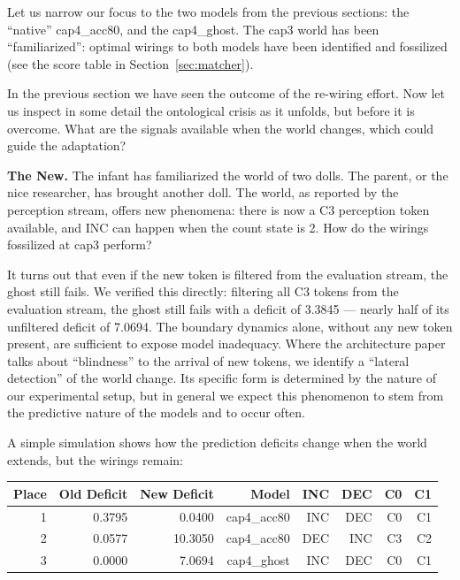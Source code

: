 \documentclass[12pt, a4paper]{article}
\begin{document}
Let us narrow our focus to the two models from the previous sections: the
``native'' cap4\_acc80, and the cap4\_ghost. The cap3 world has been
``familiarized'': optimal wirings to both models have been identified and
fossilized (see the score table in Section~\ref{sec:matcher}).

In the previous section we have seen the outcome of the re-wiring effort. Now
let us inspect in some detail the ontological crisis as it unfolds, but before
it is overcome. What are the signals available when the world changes, which
could guide the adaptation?

\textbf{The New.} The infant has familiarized the world of two dolls. The
parent, or the nice researcher, has brought another doll. The world, as
reported by the perception stream, offers new phenomena: there is now a C3
perception token available, and INC can happen when the count state is 2. How
do the wirings fossilized at cap3 perform?

It turns out that even if the new token is filtered from the evaluation stream,
the ghost still fails. We verified this directly: filtering all C3 tokens from
the evaluation stream, the ghost still fails with a deficit of 3.3845 --- nearly
half of its unfiltered deficit of 7.0694. The boundary dynamics alone, without
any new token present, are sufficient to expose model inadequacy. Where the
architecture paper talks about ``blindness'' to the arrival of new tokens, we
identify a ``lateral detection'' of the world change. Its specific form is
determined by the nature of our experimental setup, but in general we expect
this phenomenon to stem from the predictive nature of the models and to occur
often.

A simple simulation shows how the prediction deficits change when the world
extends, but the wirings remain:

\begin{center}
\begin{tabular}{rrrrrrrr}
\toprule
Place & Old Deficit & New Deficit & Model & INC & DEC & C0 & C1 \\
\midrule
1 & 0.3795 &  0.0400 & cap4\_acc80 & INC & DEC & C0 & C1 \\
2 & 0.0577 & 10.3050 & cap4\_acc80 & DEC & INC & C3 & C2 \\
3 & 0.0000 &  7.0694 & cap4\_ghost & INC & DEC & C0 & C1 \\
\bottomrule
\end{tabular}
\end{center}
\end{document}
